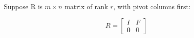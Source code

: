 \documentclass[solution,addpoints,12pt]{exam}
\begin{document}
\begin{questions}


\question[\half] Suppose R is $m \times n$ matrix of rank $r$, with pivot columns first:

\begin{equation*}
R = 
\begin{bmatrix}
I & F\\
0 & 0
\end{bmatrix}
\end{equation*}


\end{questions}
\end{document}
